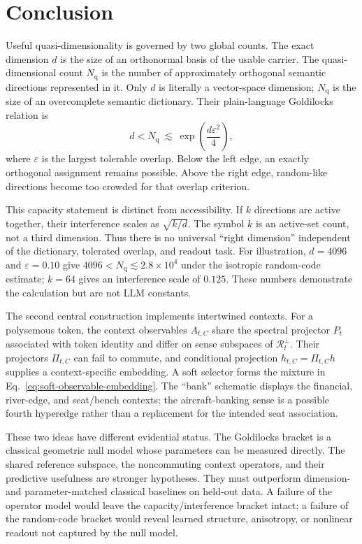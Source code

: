 \documentclass[
  aps,
  reprint,
  superscriptaddress,
  floatfix,
  nofootinbib,
  longbibliography
]{revtex4-2}
\newcommand{\Nq}{N_{\mathrm q}}
\begin{document}
\section{Conclusion}
\label{sec:conclusion}

Useful quasi-dimensionality is governed by two global counts.  The exact
dimension $d$ is the size of an orthonormal basis of the usable carrier.  The
quasi-dimensional count $\Nq$ is the number of approximately orthogonal
semantic directions represented in it.  Only $d$ is literally a vector-space
dimension; $\Nq$ is the size of an overcomplete semantic dictionary.  Their
plain-language Goldilocks relation is
%
\begin{equation}
\label{eq:summary}
\boxed{
d<\Nq\ \lesssim\ \exp\!\left(\frac{d\varepsilon^2}{4}\right)
},
\end{equation}
%
where $\varepsilon$ is the largest tolerable overlap.  Below the left edge,
an exactly orthogonal assignment remains possible.  Above the right edge,
random-like directions become too crowded for that overlap criterion.

This capacity statement is distinct from accessibility.  If $k$ directions
are active together, their interference scales as $\sqrt{k/d}$.  The symbol
$k$ is an active-set count, not a third dimension.  Thus there is no universal
``right dimension'' independent of the dictionary, tolerated overlap, and
readout task.  For illustration, $d=4096$ and $\varepsilon=0.10$ give
$4096<\Nq\lesssim2.8\times10^4$ under the isotropic random-code estimate;
$k=64$ gives an interference scale of $0.125$.  These numbers demonstrate the
calculation but are not LLM constants.

The second central construction implements intertwined contexts.  For a
polysemous token, the context observables $A_{t,C}$ share the spectral
projector $P_t$ associated with token identity and differ on sense subspaces
of $\mathcal R_t^\perp$.  Their projectors $\Pi_{t,C}$ can fail to commute,
and conditional projection
$h_{t,C}=\Pi_{t,C}h$ supplies a context-specific embedding.  A soft selector
forms the mixture in Eq.~\eqref{eq:soft-observable-embedding}.  The ``bank''
schematic displays the financial, river-edge, and seat/bench contexts; the
aircraft-banking sense is a possible fourth hyperedge rather than a replacement
for the intended seat association.

These two ideas have different evidential status.  The Goldilocks bracket is
a classical geometric null model whose parameters can be measured directly.
The shared reference subspace, the noncommuting context operators, and their
predictive usefulness are stronger hypotheses.  They must outperform
dimension- and parameter-matched classical baselines on held-out data.  A
failure of the operator model would leave the capacity/interference bracket
intact; a failure of the random-code bracket would reveal learned structure,
anisotropy, or nonlinear readout not captured by the null model.
\end{document}
